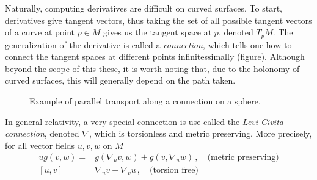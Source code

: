 Naturally, computing derivatives are difficult on curved surfaces. To start, derivatives give tangent vectors, thus taking the set of all possible tangent vectors of a curve at point $p\in M$ gives us the tangent space at $p$, denoted $T_pM$. The generalization of the derivative is called a \textit{connection}, which tells one how to connect the tangent spaces at different points infinitessimally (figure). Although beyond the scope of this these, it is worth noting that, due to the holonomy of curved surfaces, this will generally depend on the path taken.
\begin{figure}
    \centering
    \caption{Example of parallel transport along a connection on a sphere. }
\end{figure}
In general relativity, a very special connection is use called the \textit{Levi-Civita connection}, denoted $\nabla$, which is torsionless and metric preserving. More precisely, for all vector fields $u,v,w$ on $M$
\begin{equation}
    \begin{split}
        u g(v,w) =& g(\nabla_u v, w)+g(v,\nabla_uw) \,,\quad \text{(metric preserving)} \\
        [u,v] =& \nabla_u v - \nabla_v u \,,\quad \text{(torsion free)}
    \end{split}
\end{equation}


